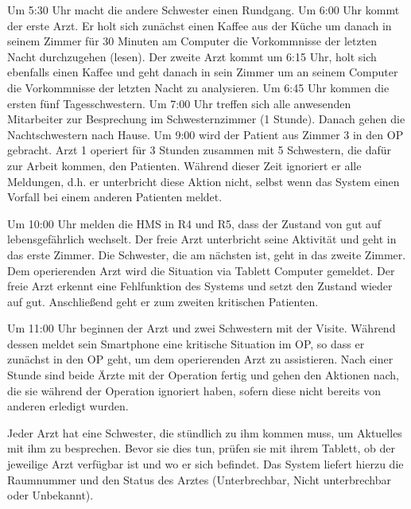Um 5:30 Uhr macht die andere Schwester einen Rundgang. Um 6:00 Uhr kommt der erste Arzt. Er holt sich zunächst einen Kaffee aus der Küche um danach in seinem Zimmer für 30 Minuten am Computer die Vorkommnisse der letzten Nacht durchzugehen (lesen). Der zweite Arzt kommt um 6:15 Uhr, holt sich ebenfalls einen Kaffee und geht danach in sein Zimmer um an seinem Computer die Vorkommnisse der letzten Nacht zu analysieren. Um 6:45 Uhr kommen die ersten fünf Tagesschwestern. Um 7:00 Uhr treffen sich alle anwesenden Mitarbeiter zur Besprechung im Schwesternzimmer (1 Stunde). Danach gehen die Nachtschwestern nach Hause. Um 9:00 wird der Patient aus Zimmer 3 in den OP gebracht. Arzt 1 operiert für 3 Stunden zusammen mit 5 Schwestern, die dafür zur Arbeit kommen, den Patienten. Während dieser Zeit ignoriert er alle Meldungen, d.h. er unterbricht diese Aktion nicht, selbst wenn das System einen Vorfall bei einem anderen Patienten meldet.

Um 10:00 Uhr melden die HMS in R4 und R5, dass der Zustand von gut auf lebensgefährlich wechselt. Der freie Arzt unterbricht seine Aktivität und geht in das erste Zimmer. Die Schwester, die am nächsten ist, geht in das zweite Zimmer. Dem operierenden Arzt wird die Situation via Tablett Computer gemeldet. Der freie Arzt erkennt eine Fehlfunktion des Systems und setzt den Zustand wieder auf \glqq gut\grqq. Anschließend geht er zum zweiten kritischen Patienten. 

Um 11:00 Uhr beginnen der Arzt und zwei Schwestern mit der Visite. Während dessen meldet sein Smartphone eine kritische Situation im OP, so dass er zunächst in den OP geht, um dem operierenden Arzt zu assistieren. Nach einer Stunde sind beide Ärzte mit der Operation fertig und gehen den Aktionen nach, die sie während der Operation ignoriert haben, sofern diese nicht bereits von anderen erledigt wurden.

Jeder Arzt hat eine Schwester, die stündlich zu ihm kommen muss, um Aktuelles mit ihm zu besprechen. Bevor sie dies tun, prüfen sie mit ihrem Tablett, ob der jeweilige Arzt verfügbar ist und wo er sich befindet. Das System liefert hierzu die Raumnummer und den Status des Arztes (Unterbrechbar, Nicht unterbrechbar oder Unbekannt).


